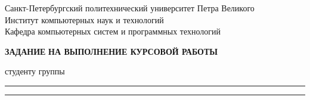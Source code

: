 \thispagestyle{empty}
\begin{center}
	\large {Санкт-Петербургский политехнический университет Петра Великого\\
			Институт компьютерных наук и технологий}\\
			Кафедра компьютерных систем и программных технологий
\end{center}

\vfill
\begin{center}
	\large{\textbf{ЗАДАНИЕ}
			\textbf{НА ВЫПОЛНЕНИЕ КУРСОВОЙ РАБОТЫ}} \\ \vspace*{1cm}
\end{center}
студенту группы \raisebox{-1em}{\small(номер группы)}\hspace*{-2.6cm}\rule{2.8cm}{0.8pt}\hspace*{1cm}\hspace*{-7.3cm}\rule{9cm}{0.8pt}
